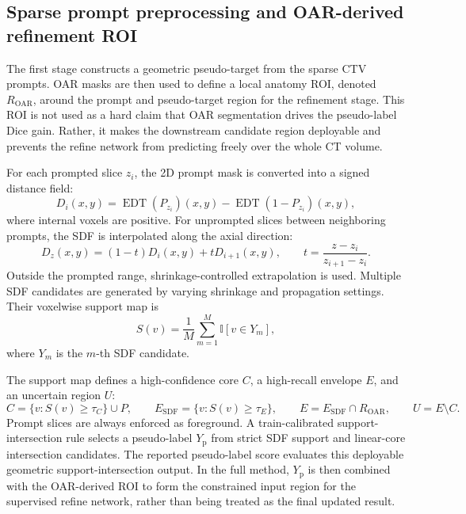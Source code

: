 \documentclass[preprint,12pt]{elsarticle}
\newcommand{\EDT}{\operatorname{EDT}}
\newcommand{\Yp}{Y_{\mathrm{p}}}
\newcommand{\ROAR}{R_{\mathrm{OAR}}}
\begin{document}
\subsection{Sparse prompt preprocessing and OAR-derived refinement ROI}

The first stage constructs a geometric pseudo-target from the sparse CTV prompts. OAR masks are then used to define a local anatomy ROI, denoted $\ROAR$, around the prompt and pseudo-target region for the refinement stage. This ROI is not used as a hard claim that OAR segmentation drives the pseudo-label Dice gain. Rather, it makes the downstream candidate region deployable and prevents the refine network from predicting freely over the whole CT volume.

For each prompted slice $z_i$, the 2D prompt mask is converted into a signed distance field:
\begin{equation}
  D_i(x,y)=\EDT(P_{z_i})(x,y)-\EDT(1-P_{z_i})(x,y),
\end{equation}
where internal voxels are positive. For unprompted slices between neighboring prompts, the SDF is interpolated along the axial direction:
\begin{equation}
  D_z(x,y)=(1-t)D_i(x,y)+tD_{i+1}(x,y),\qquad
  t=\frac{z-z_i}{z_{i+1}-z_i}.
\end{equation}
Outside the prompted range, shrinkage-controlled extrapolation is used. Multiple SDF candidates are generated by varying shrinkage and propagation settings. Their voxelwise support map is
\begin{equation}
  S(v)=\frac{1}{M}\sum_{m=1}^M \mathbb{I}[v\in Y_m],
\end{equation}
where $Y_m$ is the $m$-th SDF candidate.

The support map defines a high-confidence core $C$, a high-recall envelope $E$, and an uncertain region $U$:
\begin{equation}
  C=\{v:S(v)\geq \tau_C\}\cup P,\qquad
  E_{\mathrm{SDF}}=\{v:S(v)\geq \tau_E\},\qquad
  E=E_{\mathrm{SDF}}\cap \ROAR,\qquad
  U=E\setminus C .
\end{equation}
Prompt slices are always enforced as foreground. A train-calibrated support-intersection rule selects a pseudo-label $\Yp$ from strict SDF support and linear-core intersection candidates. The reported pseudo-label score evaluates this deployable geometric support-intersection output. In the full method, $\Yp$ is then combined with the OAR-derived ROI to form the constrained input region for the supervised refine network, rather than being treated as the final updated result.
\end{document}
